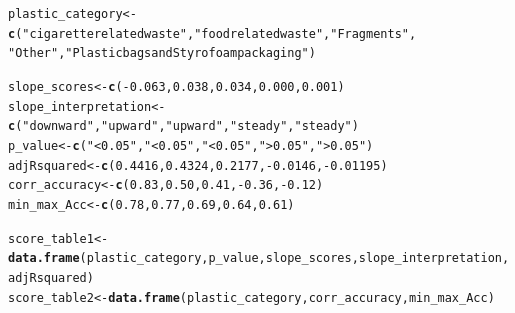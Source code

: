 \documentclass[10pt]{article}\usepackage[]{graphicx}\usepackage[]{color}
\makeatletter
\newcommand{\hlnum}[1]{\textcolor[rgb]{0.686,0.059,0.569}{#1}}%
\newcommand{\hlstr}[1]{\textcolor[rgb]{0.192,0.494,0.8}{#1}}%
\newcommand{\hlopt}[1]{\textcolor[rgb]{0,0,0}{#1}}%
\newcommand{\hlstd}[1]{\textcolor[rgb]{0.345,0.345,0.345}{#1}}%
\newcommand{\hlkwb}[1]{\textcolor[rgb]{0.69,0.353,0.396}{#1}}%
\newcommand{\hlkwd}[1]{\textcolor[rgb]{0.737,0.353,0.396}{\textbf{#1}}}%
\newenvironment{kframe}{%
 \def\at@end@of@kframe{}%
 \ifinner\ifhmode%
  \def\at@end@of@kframe{\end{minipage}}%
  \begin{minipage}{\columnwidth}%
 \fi\fi%
 \def\FrameCommand##1{\hskip\@totalleftmargin \hskip-\fboxsep
 \colorbox{shadecolor}{##1}\hskip-\fboxsep
     \hskip-\linewidth \hskip-\@totalleftmargin \hskip\columnwidth}%
 \MakeFramed {\advance\hsize-\width
   \@totalleftmargin\z@ \linewidth\hsize
   \@setminipage}}%
 {\par\unskip\endMakeFramed%
 \at@end@of@kframe}
\newenvironment{knitrout}{}{} %
\makeatother
\begin{document}
\begin{knitrout}\small
{}\color{fgcolor}\begin{kframe}
\begin{alltt}
\hlstd{plastic_category} \hlkwb{<-}\hlkwd{c}\hlstd{(}\hlstr{"cigarette related waste"}\hlstd{,} \hlstr{"food related waste"}\hlstd{,}\hlstr{"Fragments"}\hlstd{,}
                      \hlstr{"Other"}\hlstd{,}\hlstr{"Plastic bags and Styrofoam packaging"} \hlstd{)}

\hlstd{slope_scores} \hlkwb{<-} \hlkwd{c}\hlstd{(}\hlopt{-}\hlnum{0.063}\hlstd{,}\hlnum{0.038}\hlstd{,} \hlnum{0.034}\hlstd{,} \hlnum{0.000}\hlstd{,} \hlnum{0.001}\hlstd{)}
\hlstd{slope_interpretation} \hlkwb{<-}\hlkwd{c}\hlstd{(}\hlstr{"downward"}\hlstd{,} \hlstr{"upward"}\hlstd{,} \hlstr{"upward"}\hlstd{,} \hlstr{"steady"}\hlstd{,} \hlstr{"steady"}\hlstd{)}
\hlstd{p_value}\hlkwb{<-}\hlkwd{c}\hlstd{(}\hlstr{"<0.05"}\hlstd{,}\hlstr{"<0.05"}\hlstd{,}\hlstr{"<0.05"}\hlstd{,} \hlstr{">0.05"}\hlstd{,}\hlstr{">0.05"}\hlstd{)}
\hlstd{adjRsquared} \hlkwb{<-} \hlkwd{c}\hlstd{(}\hlnum{0.4416}\hlstd{,} \hlnum{0.4324}\hlstd{,} \hlnum{0.2177}\hlstd{,}  \hlopt{-}\hlnum{0.0146}\hlstd{,} \hlopt{-}\hlnum{0.01195}\hlstd{)}
\hlstd{corr_accuracy}\hlkwb{<-}\hlkwd{c}\hlstd{(}\hlnum{0.83}\hlstd{,} \hlnum{0.50}\hlstd{,} \hlnum{0.41}\hlstd{,} \hlopt{-}\hlnum{0.36}\hlstd{,}\hlopt{-}\hlnum{0.12}\hlstd{)}
\hlstd{min_max_Acc}\hlkwb{<-}\hlkwd{c}\hlstd{(}\hlnum{0.78}\hlstd{,}\hlnum{0.77}\hlstd{,}\hlnum{0.69}\hlstd{,} \hlnum{0.64} \hlstd{,}\hlnum{0.61}\hlstd{)}

\hlstd{score_table1} \hlkwb{<-} \hlkwd{data.frame}\hlstd{(plastic_category, p_value,slope_scores, slope_interpretation, adjRsquared)}
\hlstd{score_table2} \hlkwb{<-} \hlkwd{data.frame}\hlstd{(plastic_category, corr_accuracy, min_max_Acc)}
\end{alltt}
\end{kframe}
\end{knitrout}
\end{document}
